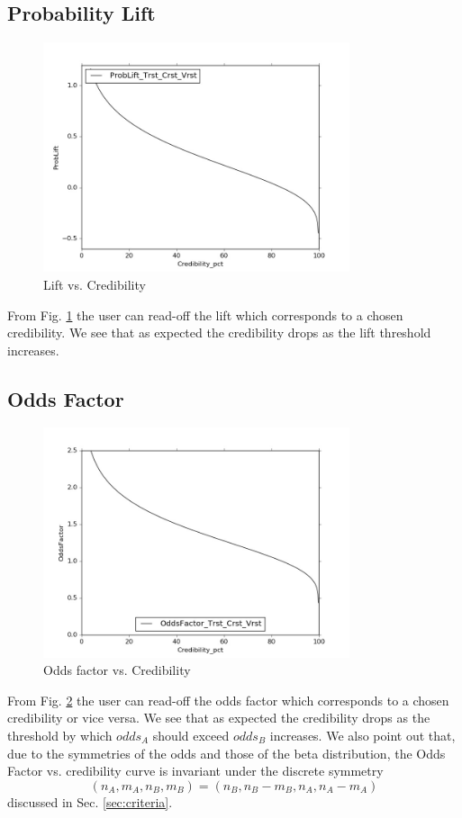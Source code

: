 \documentclass[12pt]{report}
\newcommand{\bdm}{\begin{displaymath}} %
\newcommand{\edm}{\end{displaymath}} %
\begin{document}
\subsection{Probability Lift}
\begin{figure}[ht!]
\centering
\includegraphics[width=90mm]{figures/ProbLift_Trst_Crst_Vrst}
\caption{Lift vs. Credibility \label{fig:lift_vs_cred}}
\end{figure}
From Fig.  
\ref{fig:lift_vs_cred} the user can read-off the lift which
corresponds to a chosen credibility. We see that as expected the
credibility drops as the lift threshold increases.

\subsection{Odds Factor\label{sec:odds-factor-result}}
\begin{figure}[ht!]
\centering
\includegraphics[width=90mm]{figures/OddsFactor_Trst_Crst_Vrst}
\caption{Odds factor vs. Credibility \label{fig:factor_vs_cred}}
\end{figure}
From  Fig.
\ref{fig:factor_vs_cred} the user can read-off the odds factor which
corresponds to a chosen credibility or vice versa. We see
that as expected the credibility drops as the
threshold by which \(odds_A\) should exceed \(odds_B\) increases.
We also point out that, due to the symmetries of the odds and
those of the beta distribution,
the Odds Factor vs. credibility curve is invariant under the discrete symmetry
\bdm
(n_A, m_A, n_B, m_B) = (n_B, n_B - m_B, n_A, n_A - m_A)
\edm
discussed in Sec. \ref{sec:criteria}.
\end{document}
